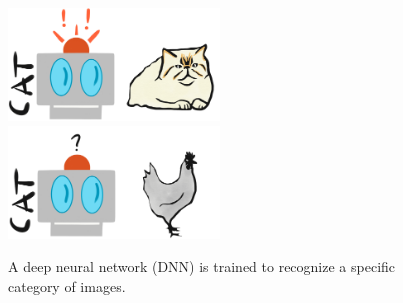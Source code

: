 \begin{figure} \label{fig:dnn}
  \begin{center}
  \includegraphics[width=0.5\textwidth]{img/recognize} \\
  \includegraphics[width=0.5\textwidth]{img/confused}
  \end{center}
  \captionsetup{singlelinecheck=off,justification=raggedright}

  \caption{A deep neural network (DNN) is trained to recognize a specific category of images.}
\end{figure}